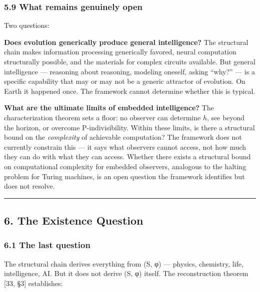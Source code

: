 \documentclass[
]{article}
\begin{document}
\hypertarget{what-remains-genuinely-open}{%
\subsubsection{5.9 What remains genuinely
open}\label{what-remains-genuinely-open}}

Two questions:

\textbf{Does evolution generically produce general intelligence?} The
structural chain makes information processing generically favored,
neural computation structurally possible, and the materials for complex
circuits available. But general intelligence --- reasoning about
reasoning, modeling oneself, asking ``why?'' --- is a specific
capability that may or may not be a generic attractor of evolution. On
Earth it happened once. The framework cannot determine whether this is
typical.

\textbf{What are the ultimate limits of embedded intelligence?} The
characterization theorem sets a floor: no observer can determine \(h\),
see beyond the horizon, or overcome P-indivisibility. Within these
limits, is there a structural bound on the \emph{complexity} of
achievable computation? The framework does not currently constrain this
--- it says what observers cannot access, not how much they can do with
what they can access. Whether there exists a structural bound on
computational complexity for embedded observers, analogous to the
halting problem for Turing machines, is an open question the framework
identifies but does not resolve.

\begin{center}\rule{0.5\linewidth}{0.5pt}\end{center}

\hypertarget{the-existence-question}{%
\subsection{6. The Existence Question}\label{the-existence-question}}

\hypertarget{the-last-question}{%
\subsubsection{6.1 The last question}\label{the-last-question}}

The structural chain derives everything from (S, φ) --- physics,
chemistry, life, intelligence, AI. But it does not derive (S, φ) itself.
The reconstruction theorem {[}33, §3{]} establishes:
\end{document}
